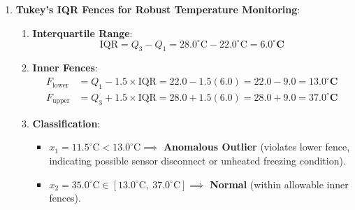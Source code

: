 \begin{enumerate}
\begin{enumerate}[label=(\alph*)]
        \item \textbf{Anomaly Score for $\mathbf{x}_B$ ($\mathbb{E}[h] = 11.5$)}:
        \begin{equation*}
        s(\mathbf{x}_B, 256) = 2^{-\frac{11.5}{10.2448}} = 2^{-1.1225} \approx \mathbf{0.4593}
        \end{equation*}

        \item \textbf{Classification ($s \ge 0.60$)}:
        \begin{itemize}
            \item Point $\mathbf{x}_A$: $s = 0.7526 \ge 0.60 \implies$ \textbf{Anomalous Outlier} (isolated very quickly in shallow leaf nodes).
            \item Point $\mathbf{x}_B$: $s = 0.4593 < 0.60 \implies$ \textbf{Normal Instance} (deeply nested in dense cluster, requiring more splits than average).
        \end{itemize}
    \end{enumerate}

    \item \textbf{Tukey's IQR Fences for Robust Temperature Monitoring}:
    \begin{enumerate}[label=(\alph*)]
        \item \textbf{Interquartile Range}:
        \begin{equation*}
        \text{IQR} = Q_3 - Q_1 = 28.0^\circ\text{C} - 22.0^\circ\text{C} = \mathbf{6.0^\circ\text{C}}
        \end{equation*}

        \item \textbf{Inner Fences}:
        \begin{align*}
        F_{\text{lower}} &= Q_1 - 1.5 \times \text{IQR} = 22.0 - 1.5(6.0) = 22.0 - 9.0 = \mathbf{13.0^\circ\text{C}} \\
        F_{\text{upper}} &= Q_3 + 1.5 \times \text{IQR} = 28.0 + 1.5(6.0) = 28.0 + 9.0 = \mathbf{37.0^\circ\text{C}}
        \end{align*}

        \item \textbf{Classification}:
        \begin{itemize}
            \item $x_1 = 11.5^\circ\text{C} < 13.0^\circ\text{C} \implies$ \textbf{Anomalous Outlier} (violates lower fence, indicating possible sensor disconnect or unheated freezing condition).
            \item $x_2 = 35.0^\circ\text{C} \in [13.0^\circ\text{C}, \ 37.0^\circ\text{C}] \implies$ \textbf{Normal} (within allowable inner fences).
        \end{itemize}
    \end{enumerate}


\end{enumerate}
